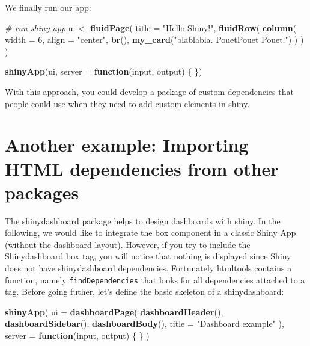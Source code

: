 \documentclass[
]{book}
\newenvironment{Shaded}{\begin{snugshade}}{\end{snugshade}}
\newcommand{\CommentTok}[1]{\textcolor[rgb]{0.56,0.35,0.01}{\textit{#1}}}
\newcommand{\ControlFlowTok}[1]{\textcolor[rgb]{0.13,0.29,0.53}{\textbf{#1}}}
\newcommand{\DataTypeTok}[1]{\textcolor[rgb]{0.13,0.29,0.53}{#1}}
\newcommand{\DecValTok}[1]{\textcolor[rgb]{0.00,0.00,0.81}{#1}}
\newcommand{\KeywordTok}[1]{\textcolor[rgb]{0.13,0.29,0.53}{\textbf{#1}}}
\newcommand{\NormalTok}[1]{#1}
\newcommand{\StringTok}[1]{\textcolor[rgb]{0.31,0.60,0.02}{#1}}
\begin{document}
We finally run our app:

\begin{Shaded}
\begin{Highlighting}[]
\CommentTok{# run shiny app }
\NormalTok{ui <-}\StringTok{ }\KeywordTok{fluidPage}\NormalTok{(}
  \DataTypeTok{title =} \StringTok{"Hello Shiny!"}\NormalTok{,}
  \KeywordTok{fluidRow}\NormalTok{(}
    \KeywordTok{column}\NormalTok{(}
      \DataTypeTok{width =} \DecValTok{6}\NormalTok{,}
      \DataTypeTok{align =} \StringTok{"center"}\NormalTok{,}
      \KeywordTok{br}\NormalTok{(),}
      \KeywordTok{my_card}\NormalTok{(}\StringTok{"blablabla. PouetPouet Pouet."}\NormalTok{)}
\NormalTok{    )}
\NormalTok{  )}
\NormalTok{)}

\KeywordTok{shinyApp}\NormalTok{(ui, }\DataTypeTok{server =} \ControlFlowTok{function}\NormalTok{(input, output) \{ \})}
\end{Highlighting}
\end{Shaded}

With this approach, you could develop a package of custom dependencies that people
could use when they need to add custom elements in shiny.

\hypertarget{another-example-importing-html-dependencies-from-other-packages}{%
\section{Another example: Importing HTML dependencies from other packages}\label{another-example-importing-html-dependencies-from-other-packages}}

The shinydashboard package helps to design dashboards with shiny. In the following, we would like to integrate the box component in a classic Shiny App (without the dashboard layout). However, if you try to include the Shinydashboard box tag, you will notice that nothing is displayed since Shiny does not have shinydashboard dependencies. Fortunately htmltools contains a function, namely \texttt{findDependencies} that looks for all dependencies attached to a tag. Before going futher, let's define the basic skeleton of a shinydashboard:

\begin{Shaded}
\begin{Highlighting}[]
\KeywordTok{shinyApp}\NormalTok{(}
  \DataTypeTok{ui =} \KeywordTok{dashboardPage}\NormalTok{(}
    \KeywordTok{dashboardHeader}\NormalTok{(),}
    \KeywordTok{dashboardSidebar}\NormalTok{(),}
    \KeywordTok{dashboardBody}\NormalTok{(),}
    \DataTypeTok{title =} \StringTok{"Dashboard example"}
\NormalTok{  ),}
  \DataTypeTok{server =} \ControlFlowTok{function}\NormalTok{(input, output) \{ \}}
\NormalTok{)}
\end{Highlighting}
\end{Shaded}
\end{document}
